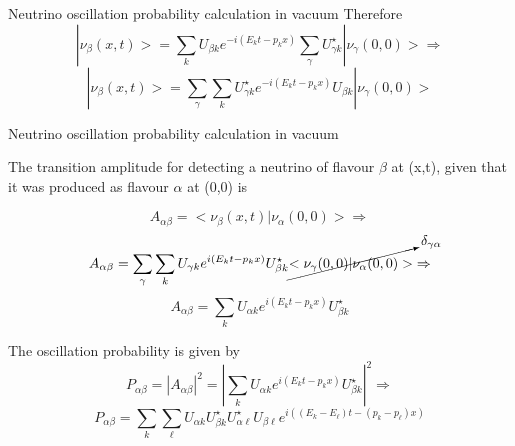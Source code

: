 {\begin{frame}{Neutrino oscillation probability calculation in vacuum}
Therefore
\begin{equation*}
    |\nu_{\beta}(x,t)> =
       \sum_{k} U_{{\beta}k} e^{-i(E_{k}t-p_{k}x)}
       \sum_{\gamma} U^{\star}_{{\gamma}k} |\nu_{\gamma}(0,0)> \Rightarrow
\end{equation*}
\begin{equation*}
    |\nu_{\beta}(x,t)> =
        \sum_{\gamma} \sum_{k}
          U^{\star}_{{\gamma}k} e^{-i(E_{k}t-p_{k}x)} U_{{\beta}k}
          |\nu_{\gamma}(0,0)>
\end{equation*}

\end{frame}

%
%
%

\begin{frame}{Neutrino oscillation probability calculation in vacuum}

The transition amplitude for detecting a neutrino of flavour $\beta$ at (x,t),
given that it was produced as flavour $\alpha$ at (0,0) is

\begin{equation*}
   A_{\alpha \beta} = <\nu_{\beta}(x,t)|\nu_{\alpha}(0,0)> \Rightarrow
\end{equation*}
\begin{equation*}
   A_{\alpha \beta} =
     \sum_{\gamma} \sum_{k}
     U_{{\gamma}k} e^{i(E_{k}t-p_{k}x)} U^{\star}_{{\beta}k}
     \cancelto{\delta_{\gamma \alpha}}{<\nu_{\gamma}(0,0)|\nu_{\alpha}(0,0)>} \Rightarrow
\end{equation*}
\begin{equation*}
   A_{\alpha \beta} =
     \sum_{k}
     U_{{\alpha}k} e^{i(E_{k}t-p_{k}x)} U^{\star}_{{\beta}k}
\end{equation*}

The oscillation probability is given by
\begin{equation*}
   P_{\alpha \beta} = |A_{\alpha \beta}|^2 =
     |\sum_{k} U_{{\alpha}k} e^{i(E_{k}t-p_{k}x)} U^{\star}_{{\beta}k}|^2 \Rightarrow
\end{equation*}
\begin{equation*}
     P_{\alpha \beta} =
        \sum_{k} \sum_{\ell}
        U_{{\alpha}k} U^{\star}_{{\beta}k}
        U^{\star}_{{\alpha}\ell} U_{{\beta}\ell}
        e^{i( (E_{k}-E_{\ell})t-(p_{k}-p_{\ell})x)}
\end{equation*}


\end{frame}}
